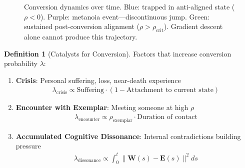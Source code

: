 \documentclass[11pt,a4paper]{article}
\theoremstyle{definition}
\newtheorem{definition}{Definition}[section]
\theoremstyle{remark}
\newcommand{\EE}{\mathbf{E}}
\newcommand{\WW}{\mathbf{W}}
\begin{document}
\begin{small}
\begin{enumerate}
\begin{figure}[H]
\caption{Conversion dynamics over time. Blue: trapped in anti-aligned state (\(\rho < 0\)). Purple: metanoia event—discontinuous jump. Green: sustained post-conversion alignment (\(\rho > \rho_{\text{crit}}\)). Gradient descent alone cannot produce this trajectory.}
\label{fig:conversion_dynamics}
\end{figure}

\begin{definition}[Catalysts for Conversion]
Factors that increase conversion probability \(\lambda\):

\begin{enumerate}
    \item \textbf{Crisis}: Personal suffering, loss, near-death experience
    \begin{align}
    \lambda_{\text{crisis}} \propto \text{Suffering} \cdot (1 - \text{Attachment to current state})
    \end{align}
    
    \item \textbf{Encounter with Exemplar}: Meeting someone at high \(\rho\)
    \begin{align}
    \lambda_{\text{encounter}} \propto \rho_{\text{exemplar}} \cdot \text{Duration of contact}
    \end{align}
    
    \item \textbf{Accumulated Cognitive Dissonance}: Internal contradictions building pressure
    \begin{align}
    \lambda_{\text{dissonance}} \propto \int_0^t \|\WW(s) - \EE(s)\|^2 ds
    \end{align}
    

\end{enumerate}
\end{definition}
\end{enumerate}
\end{small}
\end{document}
